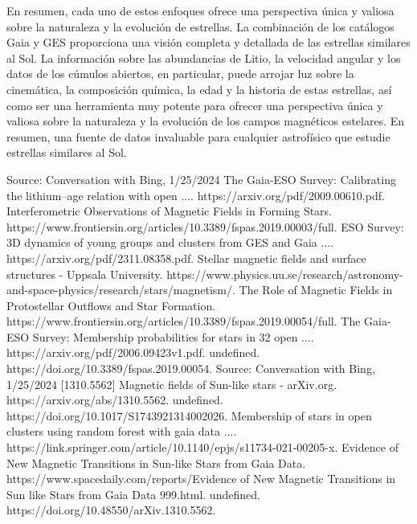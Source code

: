 En resumen, cada uno de estos enfoques ofrece una perspectiva única y valiosa sobre la naturaleza y la evolución de estrellas. La combinación de los catálogos Gaia y GES proporciona una visión completa y detallada de las estrellas similares al Sol. La información sobre las abundancias de Litio, la velocidad angular y los datos de los cúmulos abiertos, en particular, puede arrojar luz sobre la cinemática, la composición química, la edad y la historia de estas estrellas, así como ser una herramienta muy potente para ofrecer una perspectiva única y valiosa sobre la naturaleza y la evolución de los campos magnéticos estelares.  En resumen, una fuente de datos invaluable para cualquier astrofísico que estudie estrellas similares al Sol.\par





Source: Conversation with Bing, 1/25/2024
The Gaia-ESO Survey: Calibrating the lithium–age relation with open .... https://arxiv.org/pdf/2009.00610.pdf.
Interferometric Observations of Magnetic Fields in Forming Stars. https://www.frontiersin.org/articles/10.3389/fspas.2019.00003/full.
ESO Survey: 3D dynamics of young groups and clusters from GES and Gaia .... https://arxiv.org/pdf/2311.08358.pdf.
Stellar magnetic fields and surface structures - Uppsala University. https://www.physics.uu.se/research/astronomy-and-space-physics/research/stars/magnetism/.
The Role of Magnetic Fields in Protostellar Outflows and Star Formation. https://www.frontiersin.org/articles/10.3389/fspas.2019.00054/full.
The Gaia-ESO Survey: Membership probabilities for stars in 32 open .... https://arxiv.org/pdf/2006.09423v1.pdf.
undefined. https://doi.org/10.3389/fspas.2019.00054.
Source: Conversation with Bing, 1/25/2024
[1310.5562] Magnetic fields of Sun-like stars - arXiv.org. https://arxiv.org/abs/1310.5562.
undefined. https://doi.org/10.1017/S1743921314002026.
Membership of stars in open clusters using random forest with gaia data .... https://link.springer.com/article/10.1140/epjs/s11734-021-00205-x.
Evidence of New Magnetic Transitions in Sun-like Stars from Gaia Data. https://www.spacedaily.com/reports/Evidence of New Magnetic Transitions in Sun like Stars from Gaia Data 999.html.
undefined. https://doi.org/10.48550/arXiv.1310.5562.



\endinput
